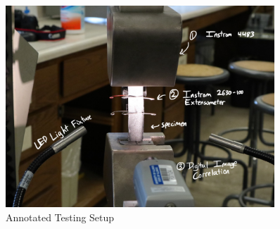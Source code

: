 \begin{figure}[!h]
    \centering
    \includegraphics[width=0.9\textwidth]{Pictures/Apparatus/Experiment 6/testsetup_extensometer.JPG}
    \caption{Annotated Testing Setup}
    \label{fig:exp6setup}
\end{figure}